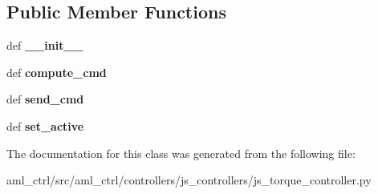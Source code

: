 \subsection*{Public Member Functions}
\begin{DoxyCompactItemize}
\item 
\hypertarget{classaml__ctrl_1_1controllers_1_1js__controllers_1_1js__torque__controller_1_1_j_s_torque_controller_a1cc8b9321fab9b63bb8212e59e9735cb}{def {\bfseries \-\_\-\-\_\-init\-\_\-\-\_\-}}\label{classaml__ctrl_1_1controllers_1_1js__controllers_1_1js__torque__controller_1_1_j_s_torque_controller_a1cc8b9321fab9b63bb8212e59e9735cb}

\item 
\hypertarget{classaml__ctrl_1_1controllers_1_1js__controllers_1_1js__torque__controller_1_1_j_s_torque_controller_a3fae7e120ee2a3aeab1c4cee82944679}{def {\bfseries compute\-\_\-cmd}}\label{classaml__ctrl_1_1controllers_1_1js__controllers_1_1js__torque__controller_1_1_j_s_torque_controller_a3fae7e120ee2a3aeab1c4cee82944679}

\item 
\hypertarget{classaml__ctrl_1_1controllers_1_1js__controllers_1_1js__torque__controller_1_1_j_s_torque_controller_ad71857a9e2237ed2ae431c28e55e0c93}{def {\bfseries send\-\_\-cmd}}\label{classaml__ctrl_1_1controllers_1_1js__controllers_1_1js__torque__controller_1_1_j_s_torque_controller_ad71857a9e2237ed2ae431c28e55e0c93}

\item 
\hypertarget{classaml__ctrl_1_1controllers_1_1js__controllers_1_1js__torque__controller_1_1_j_s_torque_controller_a6056c3e756f525d1a6e784d3fb859d4f}{def {\bfseries set\-\_\-active}}\label{classaml__ctrl_1_1controllers_1_1js__controllers_1_1js__torque__controller_1_1_j_s_torque_controller_a6056c3e756f525d1a6e784d3fb859d4f}

\end{DoxyCompactItemize}


The documentation for this class was generated from the following file\-:\begin{DoxyCompactItemize}
\item 
aml\-\_\-ctrl/src/aml\-\_\-ctrl/controllers/js\-\_\-controllers/js\-\_\-torque\-\_\-controller.\-py\end{DoxyCompactItemize}
